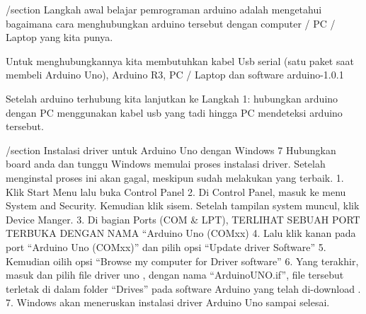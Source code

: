  /section
 Langkah awal belajar pemrograman arduino adalah mengetahui bagaimana cara menghubungkan arduino tersebut dengan computer / PC / Laptop yang kita punya.

Untuk menghubungkannya kita membutuhkan kabel Usb serial (satu paket saat membeli Arduino Uno), Arduino R3, PC / Laptop dan software arduino-1.0.1

Setelah arduino terhubung kita lanjutkan ke Langkah 1:
hubungkan arduino dengan PC menggunakan kabel usb yang tadi hingga PC mendeteksi arduino tersebut. 

/section
Instalasi driver untuk Arduino Uno dengan Windows 7
Hubungkan board anda dan tunggu Windows memulai proses instalasi driver. Setelah menginstal proses ini akan gagal, meskipun sudah melakukan yang terbaik.
1.	Klik Start Menu lalu buka Control Panel
2.	Di Control Panel, masuk ke menu System and Security. Kemudian klik sisem. Setelah tampilan system muncul, klik Device Manger.
3.	Di bagian Ports (COM & LPT), TERLIHAT SEBUAH PORT TERBUKA DENGAN NAMA “Arduino Uno (COMxx)
4.	Lalu klik kanan pada port “Arduino Uno (COMxx)” dan pilih opsi “Update driver Software”
5.	Kemudian oilih opsi “Browse my computer for Driver software”
6.	Yang terakhir, masuk dan pilih file driver uno , dengan nama “ArduinoUNO.if”, file tersebut terletak di dalam folder “Drives” pada software Arduino yang telah di-download .
7.	Windows akan meneruskan instalasi driver Arduino Uno sampai selesai.

